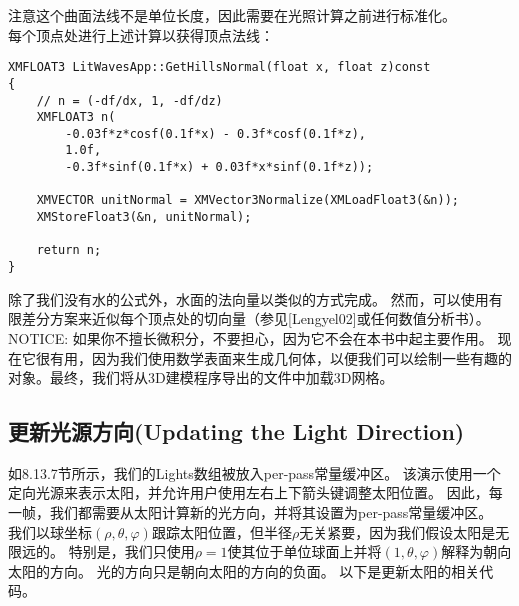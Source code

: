 \begin{flushleft}
注意这个曲面法线不是单位长度，因此需要在光照计算之前进行标准化。\\
每个顶点处进行上述计算以获得顶点法线：\\
\end{flushleft}

\begin{lstlisting}
XMFLOAT3 LitWavesApp::GetHillsNormal(float x, float z)const
{
    // n = (-df/dx, 1, -df/dz)
    XMFLOAT3 n(
        -0.03f*z*cosf(0.1f*x) - 0.3f*cosf(0.1f*z),
        1.0f,
        -0.3f*sinf(0.1f*x) + 0.03f*x*sinf(0.1f*z));

    XMVECTOR unitNormal = XMVector3Normalize(XMLoadFloat3(&n));
    XMStoreFloat3(&n, unitNormal);

    return n;
}
\end{lstlisting}

\begin{flushleft}
除了我们没有水的公式外，水面的法向量以类似的方式完成。 然而，可以使用有限差分方案来近似每个顶点处的切向量（参见[Lengyel02]或任何数值分析书）。\\

NOTICE: 如果你不擅长微积分，不要担心，因为它不会在本书中起主要作用。 现在它很有用，因为我们使用数学表面来生成几何体，以便我们可以绘制一些有趣的对象。最终，我们将从3D建模程序导出的文件中加载3D网格。
\end{flushleft}

\subsection{更新光源方向(Updating the Light Direction)}
\begin{flushleft}
如8.13.7节所示，我们的Lights数组被放入per-pass常量缓冲区。 该演示使用一个定向光源来表示太阳，并允许用户使用左右上下箭头键调整太阳位置。 因此，每一帧，我们都需要从太阳计算新的光方向，并将其设置为per-pass常量缓冲区。\\
我们以球坐标$(\rho ,\theta ,\varphi)$跟踪太阳位置，但半径$\rho$无关紧要，因为我们假设太阳是无限远的。 特别是，我们只使用$\rho=1$使其位于单位球面上并将$(1 ,\theta ,\varphi)$解释为朝向太阳的方向。 光的方向只是朝向太阳的方向的负面。 以下是更新太阳的相关代码。\\
\end{flushleft}

